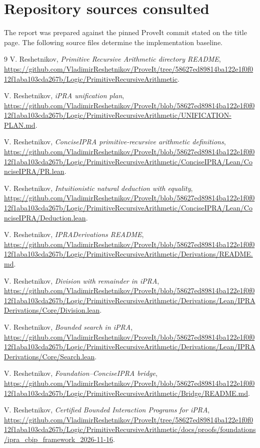 \section{Repository sources consulted}

The report was prepared against the pinned ProveIt commit stated on the title
page.  The following source files determine the implementation baseline.

\begin{thebibliography}{9}
V. Reshetnikov,
\emph{Primitive Recursive Arithmetic directory README},
\url{https://github.com/VladimirReshetnikov/ProveIt/tree/58627ed89814ba122e1f0f012f1aba103cda267b/Logic/PrimitiveRecursiveArithmetic}.

V. Reshetnikov,
\emph{iPRA unification plan},
\url{https://github.com/VladimirReshetnikov/ProveIt/blob/58627ed89814ba122e1f0f012f1aba103cda267b/Logic/PrimitiveRecursiveArithmetic/UNIFICATION-PLAN.md}.

V. Reshetnikov,
\emph{ConciseIPRA primitive-recursive arithmetic definitions},
\url{https://github.com/VladimirReshetnikov/ProveIt/blob/58627ed89814ba122e1f0f012f1aba103cda267b/Logic/PrimitiveRecursiveArithmetic/ConciseIPRA/Lean/ConciseIPRA/PR.lean}.

V. Reshetnikov,
\emph{Intuitionistic natural deduction with equality},
\url{https://github.com/VladimirReshetnikov/ProveIt/blob/58627ed89814ba122e1f0f012f1aba103cda267b/Logic/PrimitiveRecursiveArithmetic/ConciseIPRA/Lean/ConciseIPRA/Deduction.lean}.

V. Reshetnikov,
\emph{IPRADerivations README},
\url{https://github.com/VladimirReshetnikov/ProveIt/blob/58627ed89814ba122e1f0f012f1aba103cda267b/Logic/PrimitiveRecursiveArithmetic/Derivations/README.md}.

V. Reshetnikov,
\emph{Division with remainder in iPRA},
\url{https://github.com/VladimirReshetnikov/ProveIt/blob/58627ed89814ba122e1f0f012f1aba103cda267b/Logic/PrimitiveRecursiveArithmetic/Derivations/Lean/IPRADerivations/Core/Division.lean}.

V. Reshetnikov,
\emph{Bounded search in iPRA},
\url{https://github.com/VladimirReshetnikov/ProveIt/blob/58627ed89814ba122e1f0f012f1aba103cda267b/Logic/PrimitiveRecursiveArithmetic/Derivations/Lean/IPRADerivations/Core/Search.lean}.

V. Reshetnikov,
\emph{Foundation--ConciseIPRA bridge},
\url{https://github.com/VladimirReshetnikov/ProveIt/blob/58627ed89814ba122e1f0f012f1aba103cda267b/Logic/PrimitiveRecursiveArithmetic/Bridge/README.md}.

V. Reshetnikov,
\emph{Certified Bounded Interaction Programs for iPRA},
\url{https://github.com/VladimirReshetnikov/ProveIt/tree/58627ed89814ba122e1f0f012f1aba103cda267b/Logic/PrimitiveRecursiveArithmetic/docs/proofs/foundations/ipra_cbip_framework_2026-11-16}.
\end{thebibliography}
